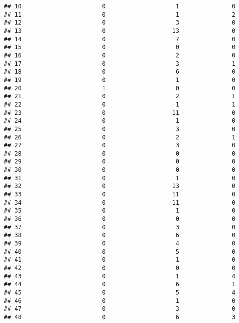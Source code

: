\documentclass[
]{article}
\begin{document}
\begin{verbatim}
## 10                       0                    1               0
## 11                       0                    1               2
## 12                       0                    3               0
## 13                       0                   13               0
## 14                       0                    7               0
## 15                       0                    0               0
## 16                       0                    2               0
## 17                       0                    3               1
## 18                       0                    6               0
## 19                       0                    1               0
## 20                       1                    0               0
## 21                       0                    2               1
## 22                       0                    1               1
## 23                       0                   11               0
## 24                       0                    1               0
## 25                       0                    3               0
## 26                       0                    2               1
## 27                       0                    3               0
## 28                       0                    0               0
## 29                       0                    0               0
## 30                       0                    0               0
## 31                       0                    1               0
## 32                       0                   13               0
## 33                       0                   11               0
## 34                       0                   11               0
## 35                       0                    1               0
## 36                       0                    0               0
## 37                       0                    3               0
## 38                       0                    6               0
## 39                       0                    4               0
## 40                       0                    5               0
## 41                       0                    1               0
## 42                       0                    0               0
## 43                       0                    1               4
## 44                       0                    6               1
## 45                       0                    5               4
## 46                       0                    1               0
## 47                       0                    3               0
## 48                       0                    6               3

\end{verbatim}
\end{document}
